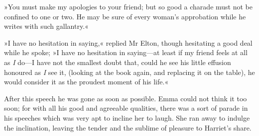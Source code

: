 »You must make my apologies to your friend; but so good a charade must not be confined to one or two. He may be sure of every woman's approbation while he writes with such gallantry.«

»I have no hesitation in saying,« replied Mr Elton, though hesitating a good deal while he spoke; »I have no hesitation in saying—at least if my friend feels at all as \textit{I} do—I have not the smallest doubt that, could he see his little effusion honoured as \textit{I} see it, (looking at the book again, and replacing it on the table), he would consider it as the proudest moment of his life.«

After this speech he was gone as soon as possible. Emma could not think it too soon; for with all his good and agreeable qualities, there was a sort of parade in his speeches which was very apt to incline her to laugh. She ran away to indulge the inclination, leaving the tender and the sublime of pleasure to Harriet's share.